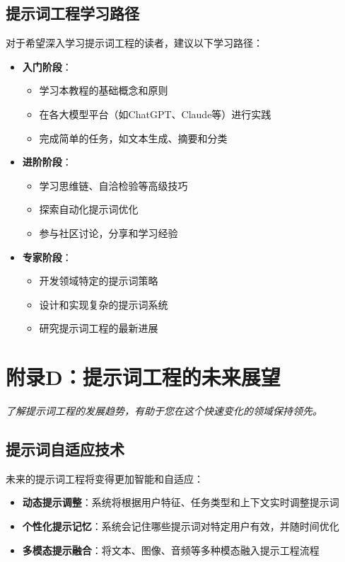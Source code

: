 \documentclass[12pt]{ctexart}
\newcommand{\chapternote}[1]{\vspace{-0.3cm}\par\noindent\textit{\small #1}\vspace{0.3cm}}
\begin{document}
\subsection{提示词工程学习路径}
对于希望深入学习提示词工程的读者，建议以下学习路径：

\begin{itemize}
  \item \textbf{入门阶段}：
    \begin{itemize}
      \item 学习本教程的基础概念和原则
      \item 在各大模型平台（如ChatGPT、Claude等）进行实践
      \item 完成简单的任务，如文本生成、摘要和分类
    \end{itemize}
  \item \textbf{进阶阶段}：
    \begin{itemize}
      \item 学习思维链、自洽检验等高级技巧
      \item 探索自动化提示词优化
      \item 参与社区讨论，分享和学习经验
    \end{itemize}
  \item \textbf{专家阶段}：
    \begin{itemize}
      \item 开发领域特定的提示词策略
      \item 设计和实现复杂的提示词系统
      \item 研究提示词工程的最新进展
    \end{itemize}
\end{itemize}

\section{附录D：提示词工程的未来展望}
\chapternote{了解提示词工程的发展趋势，有助于您在这个快速变化的领域保持领先。}

\subsection{提示词自适应技术}
未来的提示词工程将变得更加智能和自适应：

\begin{itemize}
  \item \textbf{动态提示调整}：系统将根据用户特征、任务类型和上下文实时调整提示词
  \item \textbf{个性化提示记忆}：系统会记住哪些提示词对特定用户有效，并随时间优化
  \item \textbf{多模态提示融合}：将文本、图像、音频等多种模态融入提示工程流程
\end{itemize}
\end{document}
